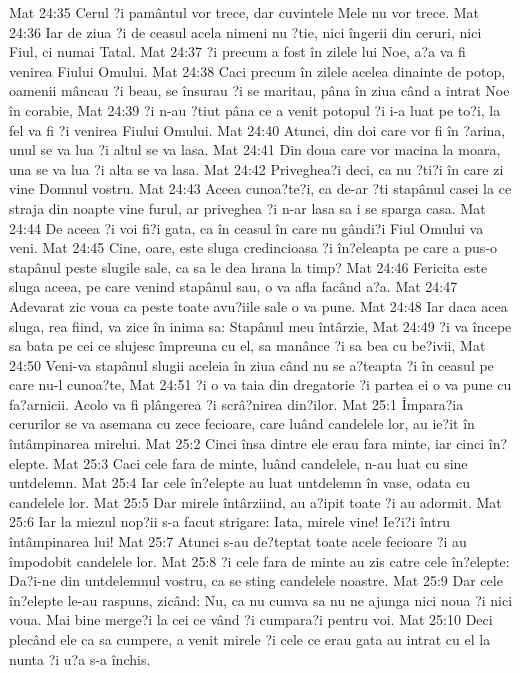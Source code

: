 Mat 24:35  Cerul ?i pamântul vor trece, dar cuvintele Mele nu vor trece.
Mat 24:36  Iar de ziua ?i de ceasul acela nimeni nu ?tie, nici îngerii din ceruri, nici Fiul, ci numai Tatal.
Mat 24:37  ?i precum a fost în zilele lui Noe, a?a va fi venirea Fiului Omului.
Mat 24:38  Caci precum în zilele acelea dinainte de potop, oamenii mâncau ?i beau, se însurau ?i se maritau, pâna în ziua când a intrat Noe în corabie,
Mat 24:39  ?i n-au ?tiut pâna ce a venit potopul ?i i-a luat pe to?i, la fel va fi ?i venirea Fiului Omului.
Mat 24:40  Atunci, din doi care vor fi în ?arina, unul se va lua ?i altul se va lasa.
Mat 24:41  Din doua care vor macina la moara, una se va lua ?i alta se va lasa.
Mat 24:42  Priveghea?i deci, ca nu ?ti?i în care zi vine Domnul vostru.
Mat 24:43  Aceea cunoa?te?i, ca de-ar ?ti stapânul casei la ce straja din noapte vine furul, ar priveghea ?i n-ar lasa sa i se sparga casa.
Mat 24:44  De aceea ?i voi fi?i gata, ca în ceasul în care nu gândi?i Fiul Omului va veni.
Mat 24:45  Cine, oare, este sluga credincioasa ?i în?eleapta pe care a pus-o stapânul peste slugile sale, ca sa le dea hrana la timp?
Mat 24:46  Fericita este sluga aceea, pe care venind stapânul sau, o va afla facând a?a.
Mat 24:47  Adevarat zic voua ca peste toate avu?iile sale o va pune.
Mat 24:48  Iar daca acea sluga, rea fiind, va zice în inima sa: Stapânul meu întârzie,
Mat 24:49  ?i va începe sa bata pe cei ce slujesc împreuna cu el, sa manânce ?i sa bea cu be?ivii,
Mat 24:50  Veni-va stapânul slugii aceleia în ziua când nu se a?teapta ?i în ceasul pe care nu-l cunoa?te,
Mat 24:51  ?i o va taia din dregatorie ?i partea ei o va pune cu fa?arnicii. Acolo va fi plângerea ?i scrâ?nirea din?ilor.
Mat 25:1  Împara?ia cerurilor se va asemana cu zece fecioare, care luând candelele lor, au ie?it în întâmpinarea mirelui.
Mat 25:2  Cinci însa dintre ele erau fara minte, iar cinci în?elepte.
Mat 25:3  Caci cele fara de minte, luând candelele, n-au luat cu sine untdelemn.
Mat 25:4  Iar cele în?elepte au luat untdelemn în vase, odata cu candelele lor.
Mat 25:5  Dar mirele întârziind, au a?ipit toate ?i au adormit.
Mat 25:6  Iar la miezul nop?ii s-a facut strigare: Iata, mirele vine! Ie?i?i întru întâmpinarea lui!
Mat 25:7  Atunci s-au de?teptat toate acele fecioare ?i au împodobit candelele lor.
Mat 25:8  ?i cele fara de minte au zis catre cele în?elepte: Da?i-ne din untdelemnul vostru, ca se sting candelele noastre.
Mat 25:9  Dar cele în?elepte le-au raspuns, zicând: Nu, ca nu cumva sa nu ne ajunga nici noua ?i nici voua. Mai bine merge?i la cei ce vând ?i cumpara?i pentru voi.
Mat 25:10  Deci plecând ele ca sa cumpere, a venit mirele ?i cele ce erau gata au intrat cu el la nunta ?i u?a s-a închis.

